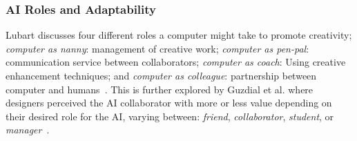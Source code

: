 
\subsubsection{AI Roles and Adaptability}


Lubart discusses four different roles a computer might take to promote creativity; \emph{computer as nanny}: management of creative work; \emph{computer as pen-pal}: communication service between collaborators; \emph{computer as coach}: Using creative enhancement techniques; and \emph{computer as colleague}: partnership between computer and humans~\cite{p13lubart_how_2005}. This is further explored by Guzdial et al. where designers perceived the AI collaborator with more or less value depending on their desired role for the AI, varying between: \emph{friend}, \emph{collaborator}, \emph{student}, or \emph{manager}~\cite{p13guzdial_friend_2019}.


